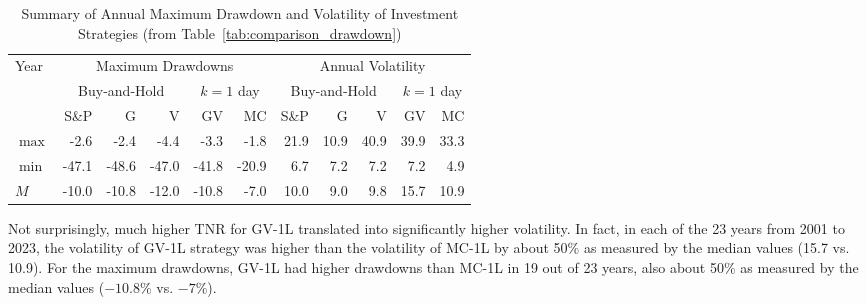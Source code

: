 \documentclass{article}
\begin{document}
\begin{table}[!ht]
    \centering
    \caption{Summary of Annual Maximum Drawdown and Volatility of Investment Strategies (from Table~\ref{tab:comparison_drawdown})}
    \medskip
    \begin{tabular}{l || rrr || rr || rrr || rr }
    \hline
\multirow{3}{*}{Year} & \multicolumn{5}{c||}{Maximum Drawdowns}& \multicolumn{5}{c}{Annual Volatility}     \\\cline{2-11}
 & \multicolumn{3}{c||}{Buy-and-Hold}   
& \multicolumn{2}{c||}{$k=1$  day} &   \multicolumn{3}{c||}{Buy-and-Hold}   & \multicolumn{2}{c}{$k=1$  day}   \\  \cline{2-11}
  & S\&P & G & V   & GV & MC & S\&P & G & V  & GV &  MC \\ \hline
         $\max$ & -2.6 & \cellcolor{green!25}-2.4 & \cellcolor{red!25}-4.4 & \cellcolor{red!25}-3.3 & -1.8 & 21.9 & \cellcolor{green!25}10.9 & \cellcolor{red!25}40.9 & \cellcolor{red!25}39.9 & 33.3 \\ 
        $\min$ & -47.1 & \cellcolor{red!25}-48.6 & \cellcolor{green!25}-47.0 & \cellcolor{red!25}-41.8 & -20.9 & \cellcolor{green!25}6.7 & \cellcolor{red!25}7.2 & \cellcolor{red!25}7.2 & \cellcolor{red!25}7.2 & 4.9 \\ 
        $M$ & \cellcolor{green!25}-10.0 & -10.8 & \cellcolor{red!25}-12.0 & \cellcolor{red!25}-10.8 & -7.0 & \cellcolor{red!25}10.0 & \cellcolor{green!25}9.0 & 9.8 & \cellcolor{red!25}15.7 & 10.9 \\ 
\hline
    \end{tabular}
    \label{tab:comparison_drawdown_summary}
\end{table}

Not surprisingly, much higher TNR for GV-1L translated into significantly higher volatility.
In fact, in each of the 23 years from 2001 to 2023, the volatility of GV-1L strategy was higher than the volatility of MC-1L
by about 50\% as measured by the median values (15.7 vs. 10.9). For the maximum drawdowns, GV-1L had higher drawdowns than
MC-1L in 19 out of 23 years, also about 50\% as measured by the median values ($-10.8\%$ vs.  $-7\%$). 
\end{document}
